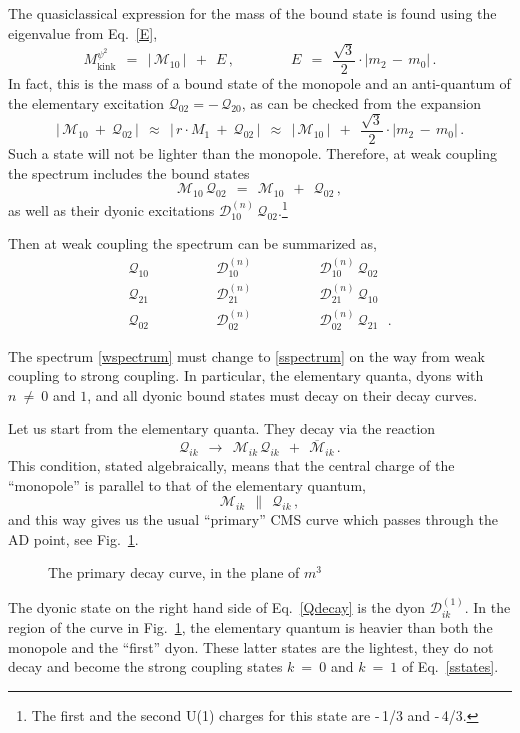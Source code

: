 \documentclass[epsfig,12pt]{article}
\def\beq{\begin{equation}}
\def\eeq{\end{equation}}
\def\beq{\begin{equation}}
\def\eeq{\end{equation}}
\newcommand{\ov}{\overline}
\newcommand{\M}{\mathcal{M}}
\newcommand{\Q}{\mathcal{Q}}
\newcommand{\D}{\mathcal{D}}
\begin{document}
	The quasiclassical expression for the mass of the bound state is found using the eigenvalue from Eq.~\eqref{E},
\beq
\label{kinkpsi}
	M_\text{kink}^{\psi^2}  ~~=~~ \left|\, \M_{10} \,\right|  ~~+~~  E\,,  
	\qquad\qquad
	E  ~~=~~  \frac{\sqrt{3}}{2} \cdot | m_2 \,-\, m_0 |\,.
\eeq
	In fact, this is the mass of a bound state of the monopole and an anti-quantum of the 
	elementary excitation
$ \Q_{02} =  -\, \Q_{20} $,
	as can be checked from the expansion
\beq
	\left|\, \M_{10} ~+~ \Q_{02} \,\right|  ~~\approx~~  \left|\, r \cdot M_1 ~+~ \Q_{02} \,\right|
					        ~~\approx~~  \left|\, \M_{10} \,\right|  ~~+~~  \frac{\sqrt{3}}{2} \cdot | m_2 \,-\, m_0 |\,.
\eeq
	Such a state will not be lighter than the monopole.
	Therefore, at weak coupling the spectrum includes the bound states
\beq
	\M_{10}\,\Q_{02}  ~~=~~  \M_{10}  ~~+~~  \Q_{02}\,,
\eeq
	as well as their dyonic excitations $ \D_{10}^{(n)}\,\Q_{02} $.\footnote{The first and the second U(1) charges 
	for this state are -\,1/3 and -\,4/3.}
	

	Then at weak coupling the spectrum can be summarized as,
\beq
\label{wspectrum}
	\begin{array}{ccc}
		\Q_{10} \qquad\qquad    &    \D_{10}^{(n)} \qquad\qquad    &    \D_{10}^{(n)}\, \Q_{02}   \phantom{~~~.}    \\[2mm]
		\Q_{21} \qquad\qquad    &    \D_{21}^{(n)} \qquad\qquad    &    \D_{21}^{(n)}\, \Q_{10}   \phantom{~~~.}    \\[2mm]
		\Q_{02} \qquad\qquad    &    \D_{02}^{(n)} \qquad\qquad    &    \D_{02}^{(n)}\, \Q_{21}   ~~~.
	\end{array}
\eeq

	The spectrum \eqref{wspectrum} must change to \eqref{sspectrum} on the way from weak coupling to strong coupling.
	In particular, the elementary quanta, dyons with $ n ~\neq~ 0 $ and $ 1 $, and all dyonic bound states  
	must decay on their decay curves.

	Let us start from the elementary quanta.
	They decay via the reaction
\beq
\label{Qdecay}
	\Q_{ik}  ~~\longrightarrow~~  \M_{ik}\, \Q_{ik} ~~+~~ \ov{\M}{}_{ik}\,.
\eeq
	This condition, stated algebraically, means that the central charge of the ``monopole'' 
	is parallel to that of the elementary quantum,
\beq
\label{parallel}
	\M_{ik}  ~~\parallel~~  \Q_{ik}\,,
\eeq
	and this way gives us the usual ``primary'' CMS curve which passes through the AD point, see Fig.~\ref{fprim}.
\begin{figure}
\begin{center}
\epsfxsize=7.5cm
\caption{\small The primary decay curve, in the plane of $ m^3 $}
\label{fprim}
\end{center}
\end{figure}
	The dyonic state on the right hand side of Eq.~\eqref{Qdecay} is the dyon $ \D_{ik}^{(1)} $.
	In the region of the curve in Fig.~\ref{fprim}, the elementary quantum is heavier than both the monopole and the 
	``first'' dyon.
	These latter states are the lightest, they do not decay and become the strong coupling
	states $ k ~=~ 0 $ and $ k ~=~ 1 $ of Eq.~\eqref{sstates}.
	
\end{document}
